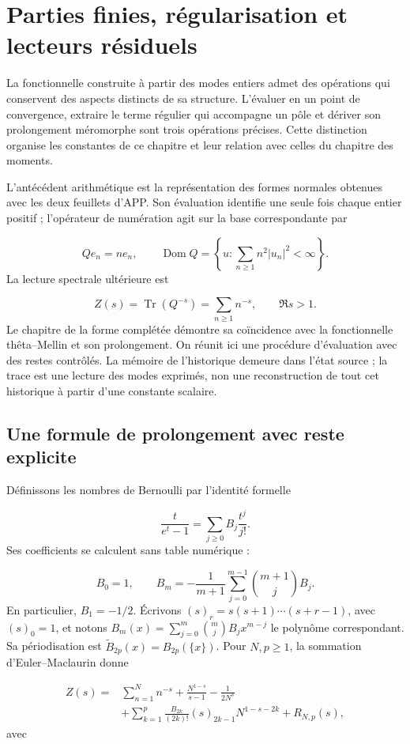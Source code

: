 \section{Parties finies, régularisation et lecteurs résiduels}
\label{lectura:manuscrito-04}
La fonctionnelle construite à partir des modes entiers admet des opérations qui conservent des aspects distincts de sa structure. L’évaluer en un point de convergence, extraire le terme régulier qui accompagne un pôle et dériver son prolongement méromorphe sont trois opérations précises. Cette distinction organise les constantes de ce chapitre et leur relation avec celles du chapitre des moments.

L'antécédent arithmétique est la représentation des formes normales obtenues avec les deux feuillets d'APP. Son évaluation identifie une seule fois chaque entier positif ; l'opérateur de numération agit sur la base correspondante par

\[
Qe_n=ne_n,\qquad
\operatorname{Dom}Q=\left\{u:\sum_{n\geq1}n^2|u_n|^2<\infty\right\}.
\]
La lecture spectrale ultérieure est

\[
Z(s)=\operatorname{Tr}(Q^{-s})=\sum_{n\geq1}n^{-s},\qquad \Re s>1.
\]
Le chapitre de la forme complétée démontre sa coïncidence avec la fonctionnelle thêta–Mellin et son prolongement. On réunit ici une procédure d'évaluation avec des restes contrôlés. La mémoire de l'historique demeure dans l'état source ; la trace est une lecture des modes exprimés, non une reconstruction de tout cet historique à partir d'une constante scalaire.

\subsection{Une formule de prolongement avec reste explicite}
Définissons les nombres de Bernoulli par l’identité formelle

\[
\frac{t}{e^t-1}=\sum_{j\geq0}B_j\frac{t^j}{j!}.
\]
Ses coefficients se calculent sans table numérique :

\[
B_0=1,\qquad
B_m=-\frac1{m+1}\sum_{j=0}^{m-1}\binom{m+1}{j}B_j.
\]
En particulier, \(B_1=-1/2\). Écrivons \((s)_r=s(s+1)\cdots(s+r-1)\), avec \((s)_0=1\), et notons \(B_m(x)=\sum_{j=0}^m\binom mjB_jx^{m-j}\) le polynôme correspondant. Sa périodisation est \(\widetilde B_{2p}(x)=B_{2p}(\{x\})\). Pour \(N,p\geq1\), la sommation d’Euler–Maclaurin donne

\[
\begin{aligned}
Z(s)={}&\sum_{n=1}^N n^{-s}+\frac{N^{1-s}}{s-1}-\frac1{2N^s}\\
&+\sum_{k=1}^p\frac{B_{2k}}{(2k)!}(s)_{2k-1}N^{1-s-2k}
+R_{N,p}(s),
\end{aligned}
\]
avec

